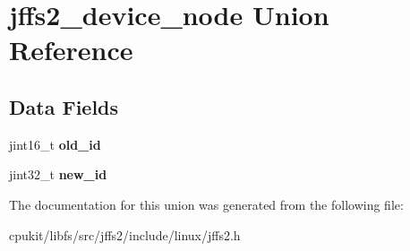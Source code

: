 \hypertarget{unionjffs2__device__node}{}\section{jffs2\+\_\+device\+\_\+node Union Reference}
\label{unionjffs2__device__node}
\subsection*{Data Fields}
\begin{DoxyCompactItemize}
\item 
\mbox{\label{unionjffs2__device__node_ac2ad3adb3ea8fc7bb6a86cd807020f17}} 
jint16\+\_\+t {\bfseries old\+\_\+id}
\item 
\mbox{\label{unionjffs2__device__node_ac8b47527acbea6758b35d7c111b1a34b}} 
jint32\+\_\+t {\bfseries new\+\_\+id}
\end{DoxyCompactItemize}


The documentation for this union was generated from the following file\+:\begin{DoxyCompactItemize}
\item 
cpukit/libfs/src/jffs2/include/linux/jffs2.\+h\end{DoxyCompactItemize}
